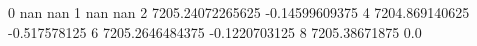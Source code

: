 0 nan nan
1 nan nan
2 7205.24072265625 -0.14599609375
4 7204.869140625 -0.517578125
6 7205.2646484375 -0.1220703125
8 7205.38671875 0.0
